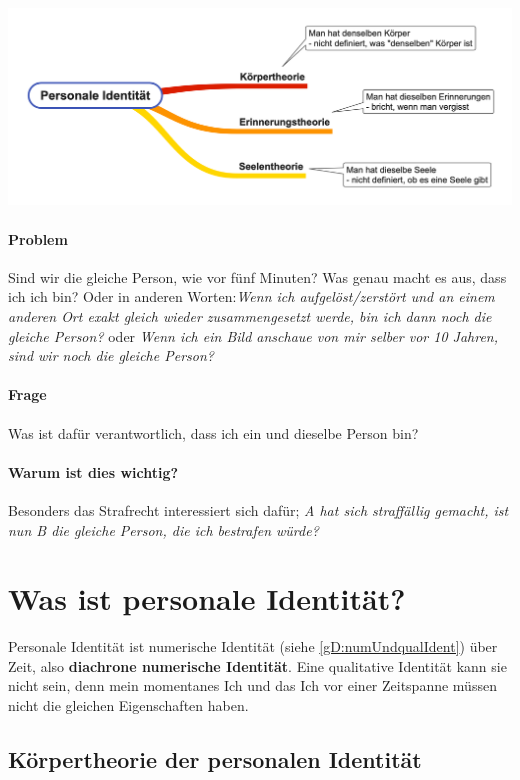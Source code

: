 \documentclass[../main.tex]{subfiles}
\begin{document}
\includegraphics[width=\textwidth]{images/Personale_Identitaet_Uebersicht.png}

\paragraph{Problem} Sind wir die gleiche Person, wie vor fünf Minuten? Was genau macht es aus, dass ich ich bin? Oder in anderen Worten:\textit{Wenn ich aufgelöst/zerstört und an einem anderen Ort exakt gleich wieder zusammengesetzt werde, bin ich dann noch die gleiche Person?} oder \textit{Wenn ich ein Bild anschaue von mir selber vor 10 Jahren, sind wir noch die gleiche Person?}

\paragraph{Frage} Was ist dafür verantwortlich, dass ich ein und dieselbe Person bin?

\paragraph{Warum ist dies wichtig?} Besonders das Strafrecht interessiert sich dafür; \textit{A hat sich straffällig gemacht, ist nun B die gleiche Person, die ich bestrafen würde?}

\section{Was ist personale Identität?}\label{SectionPersonaleIdentitaet}
Personale Identität ist numerische Identität (siehe \ref{gD:numUndqualIdent}) über Zeit, also \textbf{diachrone numerische Identität}. Eine qualitative Identität kann sie nicht sein, denn mein momentanes Ich und das Ich vor einer Zeitspanne müssen nicht die gleichen Eigenschaften haben.

\subsection{Körpertheorie der personalen Identität}
\end{document}
